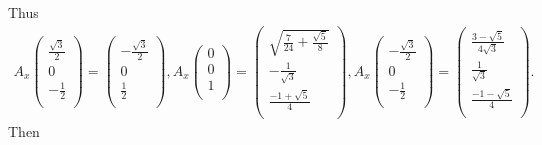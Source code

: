 \documentclass{amsart}
\begin{document}
Thus
\begin{align*}
A_x \left(
      \begin{array}{c}
        \frac{\sqrt{3}}{2} \\
        0 \\
        -\frac{1}{2} \\
      \end{array}
    \right)
    =\left(
      \begin{array}{c}
        -\frac{\sqrt{3}}{2} \\
        0 \\
        \frac{1}{2} \\
      \end{array}
    \right),
A_x \left(
      \begin{array}{c}
        0 \\
        0 \\
        1 \\
      \end{array}
    \right)
    =\left(
      \begin{array}{c}
       \sqrt{\frac{7}{24} + \frac{\sqrt{5}}{8}} \\
        -\frac{1}{\sqrt{3}} \\
       \frac{-1 + \sqrt{5}}{4} \\
      \end{array}
    \right),
A_x \left(
      \begin{array}{c}
        -\frac{\sqrt{3}}{2} \\
        0 \\
        -\frac{1}{2} \\
      \end{array}
    \right)
    =\left(
      \begin{array}{c}
        \frac{3-\sqrt{5}}{4\sqrt{3}} \\
        \frac{1}{\sqrt{3}} \\
        \frac{-1-\sqrt{5}}{4} \\
      \end{array}
    \right).
\end{align*}
Then
\end{document}
